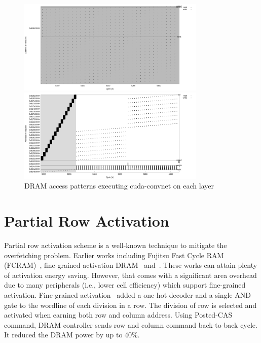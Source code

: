 \begin{figure}[t]
	\centering
	\begin{minipage}{\textwidth}
	    \centering
    	\includegraphics[width=0.80\textwidth]{figure/fcpat.png} 
    \end{minipage}	
	\begin{minipage}{\textwidth}
	    \centering
    	\includegraphics[width=0.80\textwidth]{figure/convpat.png}
    \end{minipage}
	\caption{DRAM access patterns executing cuda-convnet on each layer}
	\label{fig:ch2:pattern}
\end{figure}

\section{Partial Row Activation}
Partial row activation scheme is a well-known technique to mitigate the overfetching problem.
Earlier works including Fujitsu Fast Cycle RAM (FCRAM)~, fine-grained activation 
DRAM~ and~.
These works can attain plenty of activation energy saving. 
However, that comes with a significant area overhead due to many peripherals 
(i.e., lower cell efficiency) which support fine-grained activation.
Fine-grained activation~ added a one-hot decoder and a single AND gate to the
wordline of each division in a row. The division of row is selected and activated when earning both 
row and column address. Using Posted-CAS command, DRAM controller sends row and column command 
back-to-back cycle. It reduced the DRAM power by up to 40\%. 

